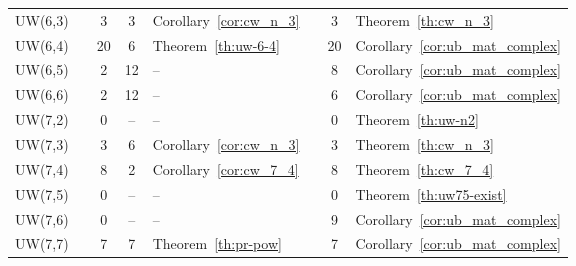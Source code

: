 \begin{table}
\begin{tabular}{@{}c c ccl c cl@{}}
 UW(6,3)       && 3  &  3 & Corollary~\ref{cor:cw_n_3} &&  3 & Theorem~\ref{th:cw_n_3}            \\
 UW(6,4)       && 20 &  6 & Theorem~\ref{th:uw-6-4}    && 20 & Corollary~\ref{cor:ub_mat_complex} \\
 \rowcolor{Gray}
 UW(6,5)       && 2  & 12 & --                         &&  8 & Corollary~\ref{cor:ub_mat_complex} \\
 \rowcolor{Gray}
 UW(6,6)       && 2  & 12 & --                         &&  6 & Corollary~\ref{cor:ub_mat_complex} \\
 UW(7,2)       && 0  & -- & --                         &&  0 & Theorem~\ref{th:uw-n2}             \\
 UW(7,3)       && 3  &  6 & Corollary~\ref{cor:cw_n_3} &&  3 & Theorem~\ref{th:cw_n_3}            \\
 UW(7,4)       && 8  &  2 & Corollary~\ref{cor:cw_7_4} &&  8 & Theorem~\ref{th:cw_7_4}            \\
 UW(7,5)       && 0  & -- & --                         &&  0 & Theorem~\ref{th:uw75-exist}        \\
 \rowcolor{Gray}
 UW(7,6)       && 0  & -- & --                         &&  9 & Corollary~\ref{cor:ub_mat_complex} \\
 UW(7,7)       && 7  &  7 & Theorem~\ref{th:pr-pow}    &&  7 & Corollary~\ref{cor:ub_mat_complex} \\
 \bottomrule
\end{tabular}
\end{table}

